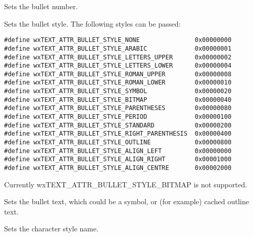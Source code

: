\label{wxtextattrsetbulletnumber}


Sets the bullet number.

\label{wxtextattrsetbulletstyle}


Sets the bullet style. The following styles can be passed:

{\small
\begin{verbatim}
#define wxTEXT_ATTR_BULLET_STYLE_NONE               0x00000000
#define wxTEXT_ATTR_BULLET_STYLE_ARABIC             0x00000001
#define wxTEXT_ATTR_BULLET_STYLE_LETTERS_UPPER      0x00000002
#define wxTEXT_ATTR_BULLET_STYLE_LETTERS_LOWER      0x00000004
#define wxTEXT_ATTR_BULLET_STYLE_ROMAN_UPPER        0x00000008
#define wxTEXT_ATTR_BULLET_STYLE_ROMAN_LOWER        0x00000010
#define wxTEXT_ATTR_BULLET_STYLE_SYMBOL             0x00000020
#define wxTEXT_ATTR_BULLET_STYLE_BITMAP             0x00000040
#define wxTEXT_ATTR_BULLET_STYLE_PARENTHESES        0x00000080
#define wxTEXT_ATTR_BULLET_STYLE_PERIOD             0x00000100
#define wxTEXT_ATTR_BULLET_STYLE_STANDARD           0x00000200
#define wxTEXT_ATTR_BULLET_STYLE_RIGHT_PARENTHESIS  0x00000400
#define wxTEXT_ATTR_BULLET_STYLE_OUTLINE            0x00000800
#define wxTEXT_ATTR_BULLET_STYLE_ALIGN_LEFT         0x00000000
#define wxTEXT_ATTR_BULLET_STYLE_ALIGN_RIGHT        0x00001000
#define wxTEXT_ATTR_BULLET_STYLE_ALIGN_CENTRE       0x00002000
\end{verbatim}
}

Currently wxTEXT\_ATTR\_BULLET\_STYLE\_BITMAP is not supported.

\label{wxtextattrsetbullettext}


Sets the bullet text, which could be a symbol, or (for example) cached outline text.

\label{wxtextattrsetcharacterstylename}


Sets the character style name.

\label{wxtextattrsetflags}

